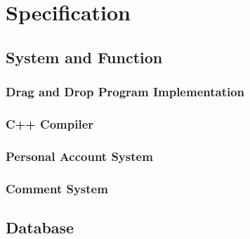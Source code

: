 \documentclass[CSCI3100_Documentation]{subfiles}
\begin{document}
  \chapter{Specification}
  \section{System and Function}
  \subsection{Drag and Drop Program Implementation}
  \subsection{C++ Compiler}
  \subsection{Personal Account System}
  \subsection{Comment System}
  \section{Database}
\end{document}
